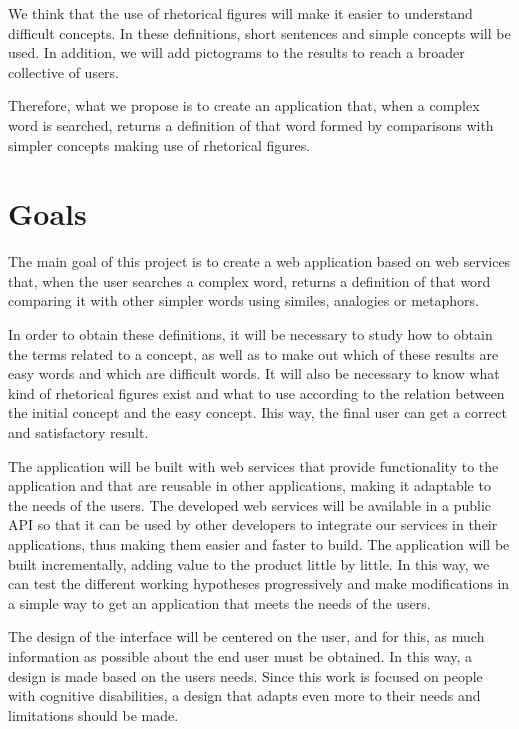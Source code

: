 We think that the use of rhetorical figures will make it easier to understand difficult concepts. In these definitions, short sentences and simple concepts will be used. In addition, we will add pictograms to the results to reach a broader collective of users.

Therefore, what we propose is to create an application that, when a complex word is searched, returns a definition of that word formed by comparisons with simpler concepts making use of rhetorical figures.


\section{Goals}
\label{sec:goals}

The main goal of this project is to create a web application based on web services that, when the user searches a complex word, returns a definition of that word comparing it with other simpler words using similes, analogies or metaphors.

In order to obtain these definitions, it will be necessary to study how to obtain the terms related to a concept, as well as to make out which of these results are easy words and which are difficult words. It will also be necessary to know what kind of rhetorical figures exist and what to use according to the relation between the initial concept and the easy concept. Ihis way, the final user can get a correct and satisfactory result.

The application will be built with web services that provide functionality to the application and that are reusable in other applications, making it adaptable to the needs of the users. The developed web services will be available in a public API so that it can be used by other developers to integrate our services in their applications, thus making them easier and faster to build. The application will be built incrementally, adding value to the product little by little. In this way, we can test the different working hypotheses progressively and make modifications in a simple way to get an application that meets the needs of the users.

The design of the interface will be centered on the user, and for this, as much information as possible about the end user must be obtained. In this way, a design is made based on the users needs. Since this work is focused on people with cognitive disabilities, a design that adapts even more to their needs and limitations should be made.

